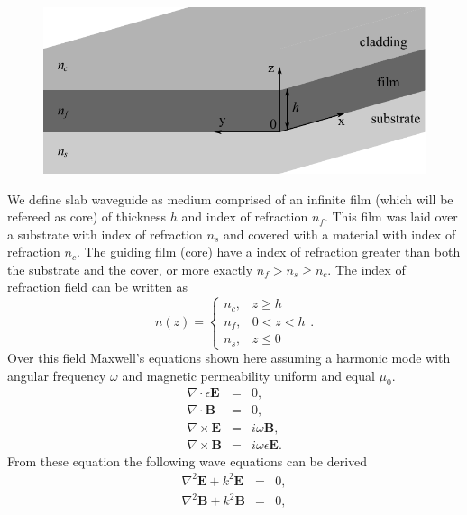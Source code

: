 \documentclass[12pt,twoside,english]{book}
\renewcommand{\~}{\perispomeni}%
\numberwithin{equation}{section}
\numberwithin{figure}{section}
\begin{document}
%
\begin{figure}[h]
\noindent \centering{}\includegraphics[scale=0.8]{figures/slab}\caption{}

\end{figure}
We define slab waveguide as medium comprised of an infinite film (which will be refereed as core) of thickness $h$ and index of refraction $n_{f}$. This film was laid over a substrate with index of refraction $n_{s}$ and covered with a material with index of refraction $n_{c}$. The guiding film (core) have a index of refraction greater than both the substrate and the cover, or more exactly $n_{f}>n_{s}\ge n_{c}$. The index of refraction field can be written as
\begin{equation}
n\left(z\right)=\begin{cases}
n_{c}, & z\ge h\\
n_{f}, & 0<z<h\\
n_{s}, & z\le0\end{cases}.\label{eq:refractive index}\end{equation}
Over this field Maxwell's equations shown here assuming a harmonic mode with angular frequency $\omega$ and magnetic permeability uniform and equal $\mu_{0}$.
\begin{subequations}\begin{eqnarray}
\nabla\cdot\epsilon\mathbf{E} & = & 0,\label{eq:maxwell 1}\\
\nabla\cdot\mathbf{B} & = & 0,\label{eq:maxwell 2}\\
\nabla\times\mathbf{E} & = & i\omega\mathbf{B,}\label{eq:maxwell 3}\\
\nabla\times\mathbf{B} & = & i\omega\epsilon\mathbf{E}.\label{eq:maxwell 4}\end{eqnarray}
\label{eq:maxwell}\end{subequations}
From these equation the following wave equations can be derived
\begin{subequations}\begin{eqnarray}
\nabla^{2}\mathbf{E}+k^{2}\mathbf{E} & = & 0,\label{eq:wave equation E}\\
\nabla^{2}\mathbf{B}+k^{2}\mathbf{B} & = & 0,\label{eq:wave equation B}\end{eqnarray}
\label{eq:wave equation}\end{subequations}
\end{document}
